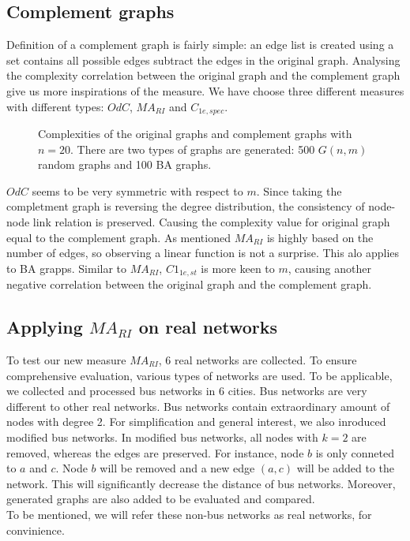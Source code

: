 \documentclass[12pt]{article}
\begin{document}
\subsection{Complement graphs}
Definition of a complement graph is fairly simple: an edge list is created using a set contains all possible edges subtract the edges in the original graph. Analysing the complexity correlation between the original graph and the complement graph give us more inspirations of the measure. We have choose three different measures with different types: $OdC$, $MA_{RI}$ and $C_{1e,spec}$.
\begin{figure}[h!]
    \caption{Complexities of the original graphs and complement graphs with $n=20$. There are two types of graphs are generated: 500 $G(n,m)$ random graphs and 100 BA graphs.}
    \label{fig:complement}
\end{figure}
$OdC$ seems to be very symmetric with respect to $m$. Since taking the completment graph is reversing the degree distribution, the consistency of node-node link relation is preserved. Causing the complexity value for original graph equal to the complement graph. As mentioned $MA_{RI}$ is highly based on the number of edges, so observing a linear function is not a surprise. This alo applies to BA grapps. Similar to $MA_{RI}$, $C1_{1e,st}$ is more keen to $m$, causing another negative correlation between the original graph and the complement graph.\\


\subsection{Applying $MA_{RI}$ on real networks}
To test our new measure $MA_{RI}$, 6 real networks are collected. To ensure comprehensive evaluation, various types of networks are used. To be applicable, we collected and processed bus networks in 6 cities. Bus networks are very different to other real networks. Bus networks contain extraordinary amount of nodes with degree 2. For simplification and general interest, we also inroduced modified bus networks. In modified bus networks, all nodes with $k=2$ are removed, whereas the edges are preserved. For instance, node $b$ is only conneted to $a$ and $c$. Node $b$ will be removed and a new edge $(a,c)$ will be added to the network. This will significantly decrease the distance of bus networks. Moreover, generated graphs are also added to be evaluated and compared.\\
To be mentioned, we will refer these non-bus networks as real networks, for convinience.
\end{document}
